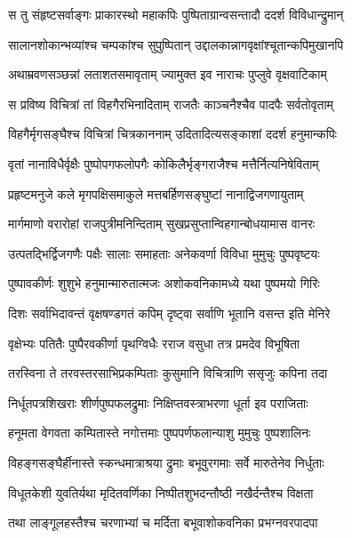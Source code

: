 \twolineshloka
{स तु संहृष्टसर्वाङ्गः प्राकारस्थो महाकपिः}
{पुष्पिताग्रान्वसन्तादौ ददर्श विविधान्द्रुमान्} %

\twolineshloka
{सालानशोकान्भव्यांश्च चम्पकांश्च सुपुष्पितान्}
{उद्दालकान्नागवृक्षांश्चूतान्कपिमुखानपि} %

\twolineshloka
{अथाम्रवणसञ्छन्नां लताशतसमावृताम्}
{ज्यामुक्त इव नाराचः पुप्लुवे वृक्षवाटिकाम्} %

\twolineshloka
{स प्रविष्य विचित्रां तां विहगैरभिनादिताम्}
{राजतैः काञ्चनैश्चैव पादपैः सर्वतोवृताम्} %

\twolineshloka
{विहगैर्मृगसङ्घैश्च विचित्रां चित्रकाननाम्}
{उदितादित्यसङ्काशां ददर्श हनुमान्कपिः} %

\twolineshloka
{वृतां नानाविधैर्वृक्षैः पुष्पोपगफलोपगैः}
{कोकिलैर्भृङ्गराजैश्च मत्तैर्नित्यनिषेविताम्} %

\twolineshloka
{प्रहृष्टमनुजे कले मृगपक्षिसमाकुले}
{मत्तबर्हिणसङ्घुष्टां नानाद्विजगणायुताम्} %

\twolineshloka
{मार्गमाणो वरारोहां राजपुत्रीमनिन्दिताम्}
{सुखप्रसुप्तान्विहगान्बोधयामास वानरः} %

\twolineshloka
{उत्पतद्भिर्द्विजगणैः पक्षैः सालाः समाहताः}
{अनेकवर्णा विविधा मुमुचुः पुष्पवृष्टयः} %

\twolineshloka
{पुष्पावकीर्णः शुशुभे हनुमान्मारुतात्मजः}
{अशोकवनिकामध्ये यथा पुष्पमयो गिरिः} %

\twolineshloka
{दिशः सर्वाभिदावन्तं वृक्षषण्डगतं कपिम्}
{दृष्ट्वा सर्वाणि भूतानि वसन्त इति मेनिरे} %

\twolineshloka
{वृक्षेभ्यः पतितैः पुष्पैरवकीर्णा पृथग्विधैः}
{रराज वसुधा तत्र प्रमदेव विभूषिता} %

\twolineshloka
{तरस्विना ते तरवस्तरसाभिप्रकम्पिताः}
{कुसुमानि विचित्राणि ससृजुः कपिना तदा} %

\twolineshloka
{निर्धूतपत्रशिखराः शीर्णपुष्पफलद्रुमाः}
{निक्षिप्तवस्त्राभरणा धूर्ता इव पराजिताः} %

\twolineshloka
{हनूमता वेगवता कम्पितास्ते नगोत्तमाः}
{पुष्पपर्णफलान्याशु मुमुचुः पुष्पशालिनः} %

\twolineshloka
{विहङ्गसङ्घैर्हीनास्ते स्कन्धमात्राश्रया द्रुमाः}
{बभूवुरगमाः सर्वे मारुतेनेव निर्धुताः} %

\twolineshloka
{विधूतकेशी युवतिर्यथा मृदितवर्णिका}
{निष्पीतशुभदन्तौष्ठी नखैर्दन्तैश्च विक्षता} %

\twolineshloka
{तथा लाङ्गूलहस्तैश्च चरणाभ्यां च मर्दिता}
{बभूवाशोकवनिका प्रभग्नवरपादपा} %

